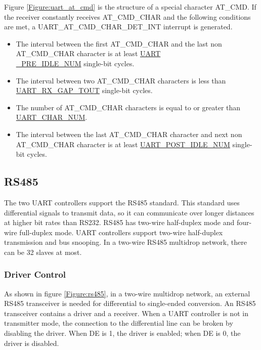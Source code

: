 \documentclass[main\_\_EN.tex]{subfiles}
\begin{document}
Figure \ref{Figure:uart_at_cmd} is the structure of a special character AT\_CMD. If the receiver constantly receives AT\_CMD\_CHAR and the following conditions are met, a UART\_AT\_CMD\_CHAR\_DET\_INT interrupt is generated.

\begin{itemize}
    \item The interval between the first AT\_CMD\_CHAR and the last non AT\_CMD\_CHAR character is at least \hyperref[fielddesc:UARTPREIDLENUM]{UART\\\_PRE\_IDLE\_NUM} single-bit cycles.
    \item The interval between two AT\_CMD\_CHAR characters is less than \hyperref[fielddesc:UARTRXGAPTOUT]{UART\_RX\_GAP\_TOUT} single-bit cycles.
    \item The number of AT\_CMD\_CHAR characters is equal to or greater than \hyperref[fielddesc:UARTCHARNUM]{UART\_CHAR\_NUM}.
    \item The interval between the last AT\_CMD\_CHAR character and next non AT\_CMD\_CHAR character is at least \hyperref[fielddesc:UARTPOSTIDLENUM]{UART\_POST\_IDLE\_NUM} single-bit cycles.
\end{itemize}

\subsection{RS485}

The two UART controllers support the RS485 standard. This standard uses differential signals to transmit data, so it can communicate over longer distances at higher bit rates than RS232. RS485 has two-wire half-duplex mode and four-wire full-duplex mode. UART controllers support two-wire half-duplex transmission and bus snooping. In a two-wire RS485 multidrop network, there can be 32 slaves at most.

\subsubsection{Driver Control}

As shown in figure \ref{Figure:rs485}, in a two-wire multidrop network, an external RS485 transceiver is needed for differential to single-ended conversion. An RS485 transceiver contains a driver and a receiver. When a UART controller is not in transmitter mode, the connection to the differential line can be broken by disabling the driver. When DE is 1, the driver is enabled; when DE is 0, the driver is disabled.
\end{document}
